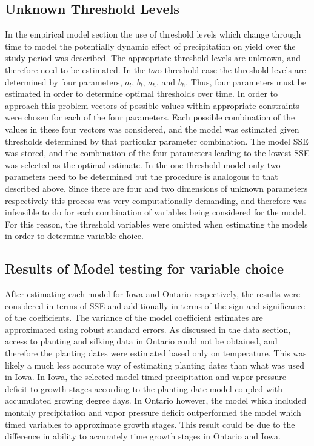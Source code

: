 \subsection{Unknown Threshold Levels}

In the empirical model section the use of threshold levels which change through time to model the potentially dynamic effect of precipitation on yield over the study period was described. The appropriate threshold levels are unknown, and therefore need to be estimated. In the two threshold case the threshold levels are determined by four parameters, $a_l$, $b_l$, $a_h$, and $b_h$. Thus, four parameters must be estimated in order to determine optimal thresholds over time. In order to approach this problem vectors of possible values within appropriate constraints were chosen for each of the four parameters. Each possible combination of the values in these four vectors was considered, and the model was estimated given thresholds determined by that particular parameter combination. The model SSE was stored, and the combination of the four parameters leading to the lowest SSE was selected as the optimal estimate. In the one threshold model only two parameters need to be determined but the procedure is analogous to that described above. Since there are four and two dimensions of unknown parameters respectively this process was very computationally demanding, and therefore was infeasible to do for each combination of variables being considered for the model. For this reason, the threshold variables were omitted when estimating the models in order to determine variable choice. 

\subsection{Results of Model testing for variable choice}

After estimating each model for Iowa and Ontario respectively, the results were considered in terms of SSE and additionally in terms of the sign and significance of the coefficients. The variance of the model coefficient estimates are approximated using robust standard errors. As discussed in the data section, access to planting and silking data in Ontario could not be obtained, and therefore the planting dates were estimated based only on temperature. This was likely a much less accurate way of estimating planting dates than what was used in Iowa. In Iowa, the selected model timed precipitation and vapor pressure deficit to growth stages according to the planting date model coupled with accumulated growing degree days. In Ontario however, the model which included monthly precipitation and vapor pressure deficit outperformed the model which timed variables to approximate growth stages.  This result could be due to the difference in ability to accurately time growth stages in Ontario and Iowa.

